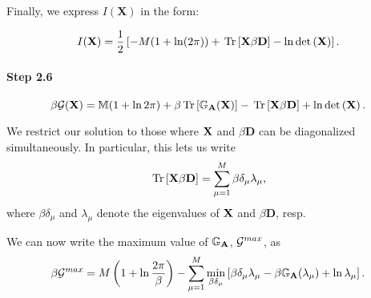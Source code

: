 Finally, we express $I(\mathbf{X})$ in the form:

\begin{equation}
I(\mathbf{X}) = \frac{1}{2} \left[ -M(1 + \ln(2\pi)) + \mbox{}\operatorname{Tr}\left[\mathbf{X}\beta\mathbf{D}\right] - \ln \mbox{}{\text{det}}\left(\mathbf{X}\right) \right].
\end{equation}

\paragraph{Step 2.6}
\begin{equation}
  \beta\mathcal{G}(\mathbf{X})=\mathbb{M}(1+\ln 2\pi)+\beta\mbox{}\operatorname{Tr}\left[\mathbb{G}_{\mathbf{A}}(\mathbf{X})\right] - \mbox{}\operatorname{Tr}\left[\mathbf{X}\beta\mathbf{D}\right] +  \ln \mbox{}{\text{det}}\left(\mathbf{X}\right).
\end{equation}

We restrict our solution to those where $\mathbf{X}$ and $\beta\mathbf{D}$ can be diagonalized simultaneously.
In particular, this lets us write
\begin{equation}
\mbox{}\operatorname{Tr}\left[\mathbf{X}\beta\mathbf{D}\right] = \sum_{\mu=1}^{M}\beta\delta_{\mu}\lambda_{\mu}   ,
\end{equation}
where $\beta\delta_{\mu}$ and $\lambda_{\mu}$ denote the eigenvalues of $\mathbf{X}$ and $\beta\mathbf{D}$, resp.

We can now write the maximum value of $\mathbb{G}_{\mathbf{A}}$, $\mathcal{G}^{max}$, as
\begin{equation}
\label{eqn:gmax_final}
\beta\mathcal{G}^{max} = M \left( 1 + \ln \frac{2\pi}{\beta} \right) - \sum_{\mu=1}^{M} \min_{\beta\delta_{\mu}} \left[\beta\delta_{\mu}\lambda_{\mu}
- \beta\mathbb{G}_{\mathbf{A}}(\lambda_{\mu}) + \ln \lambda_{\mu} \right]   .
\end{equation}


